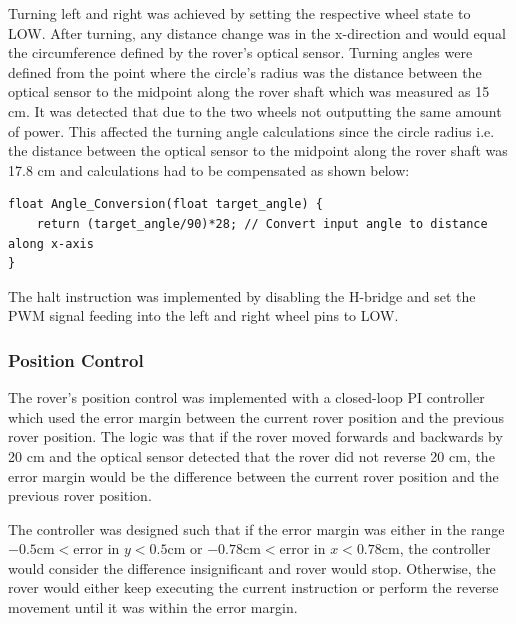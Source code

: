 \documentclass[11pt, a4paper]{article}
\begin{document}
Turning left and right was achieved by setting the respective wheel state to LOW. After turning, any distance change was in the x-direction and would equal the circumference defined by the rover's optical sensor. Turning angles were defined from the point where the circle's radius was the distance between the optical sensor to the midpoint along the rover shaft which was measured as 15 cm. It was detected that due to the two wheels not outputting the same amount of power. This affected the turning angle calculations since the circle radius i.e. the distance between the optical sensor to the midpoint along the rover shaft was 17.8 cm and calculations had to be compensated as shown below:

\begin{lstlisting}
float Angle_Conversion(float target_angle) {
    return (target_angle/90)*28; // Convert input angle to distance along x-axis
} 
\end{lstlisting}

The halt instruction was implemented by disabling the H-bridge and set the PWM signal feeding into the left and right wheel pins to LOW.

\subsubsection{Position Control}

The rover's position control was implemented with a closed-loop PI controller which used the error margin between the current rover position and the previous rover position. The logic was that if the rover moved forwards and backwards by 20 cm and the optical sensor detected that the rover did not reverse 20 cm, the error margin would be the difference between the current rover position and the previous rover position.  

The controller was designed such that if the error margin was either in the range $-0.5 \text{cm} < \text{error in } y < 0.5 \text{cm}$ or $-0.78 \text{cm} < \text{error in } x < 0.78 \text{cm}$, the controller would consider the difference insignificant and rover would stop. Otherwise, the rover would either keep executing the current instruction or perform the reverse movement until it was within the error margin. 
\end{document}
